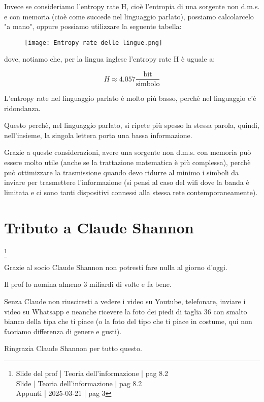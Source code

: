\newpage 

Invece se consideriamo l'entropy rate H, cioè l'entropia di una sorgente non d.m.s. e con memoria (cioè come succede nel linguaggio parlato), 
possiamo calcolarcelo "a mano", oppure possiamo utilizzare la seguente tabella: 

\begin{figure}[h]
    \centering
    \texttt{[image: Entropy rate delle lingue.png]}
\end{figure} 

dove, notiamo che, per la lingua inglese l'entropy rate H è uguale a: 

{
    \Large
    \begin{equation}
        H \approx 4.057 \frac{\text{bit}}{\text{simbolo}} 
    \end{equation}
}

L'entropy rate nel linguaggio parlato è molto più basso, perchè nel linguaggio c'è ridondanza. \newline 

Questo perchè, nel linguaggio parlato, si ripete più spesso la stessa parola, 
quindi, nell'insieme, la singola lettera porta una bassa informazione. \newline 

Grazie a queste considerazioni, avere una sorgente non d.m.s. con memoria può essere molto utile (anche se la trattazione matematica è più complessa), 
perchè può ottimizzare la trasmissione quando devo ridurre al minimo i simboli da inviare per trasmettere l'informazione (si pensi al caso del wifi dove la banda è limitata e ci sono tanti dispositivi connessi alla stessa rete contemporaneamente). \newline 

\newpage 

\section{Tributo a Claude Shannon}
\footnote{Slide del prof | Teoria dell'informazione | pag 8.2 \\  
Slide | Teoria dell'informazione | pag 8.2 \\
Appunti | 2025-03-21 | pag 3
}

\begin{tcolorbox}
    Grazie al socio Claude Shannon non potresti fare nulla al giorno d'oggi. \newline

    Il prof lo nomina almeno 3 miliardi di volte e fa bene. \newline 

    Senza Claude non riusciresti a vedere i video su Youtube, telefonare, inviare i video su Whatsapp e neanche ricevere la foto dei piedi di taglia 36 con smalto bianco della tipa che ti piace 
    (o la foto del tipo che ti piace in costume, qui non facciamo differenza di genere e gusti). \newline
    
    Ringrazia Claude Shannon per tutto questo. 
\end{tcolorbox}

